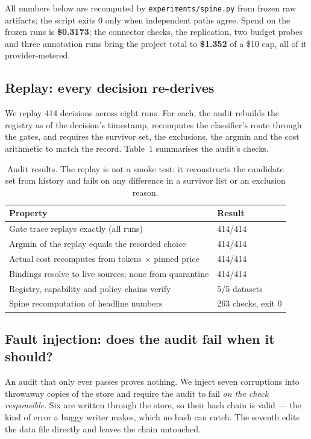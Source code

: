 \documentclass[11pt]{article}
\newcommand{\code}[1]{\texttt{#1}}
\begin{document}
All numbers below are recomputed by \code{experiments/spine.py} from frozen raw artifacts; the
script exits 0 only when independent paths agree. Spend on the frozen runs is \textbf{\$0.3173};
the connector checks, the replication, two budget probes and three annotation runs bring the project
total to \textbf{\$1.352} of a \$10 cap, all of it provider-metered.

\subsection{Replay: every decision re-derives}
\label{sec:replay}

We replay 414 decisions across eight runs. For each, the audit rebuilds the registry as of the
decision's timestamp, recomputes the classifier's route through the gates, and requires the
survivor set, the exclusions, the argmin and the cost arithmetic to match the record. Table~1
summarises the audit's checks.

\begin{table}[h]
\centering
\small
\begin{tabular}{@{}p{}p{}@{}}
\toprule
\textbf{Property} & \textbf{Result} \\
\midrule
Gate trace replays exactly (all runs) & 414/414 \\
Argmin of the replay equals the recorded choice & 414/414 \\
Actual cost recomputes from tokens $\times$ pinned price & 414/414 \\
Bindings resolve to live sources; none from quarantine & 414/414 \\
Registry, capability and policy chains verify & 5/5 datasets \\
Spine recomputation of headline numbers & 263 checks, exit 0 \\
\bottomrule
\end{tabular}
\caption{Audit results. The replay is not a smoke test: it reconstructs the candidate set from
history and fails on any difference in a survivor list or an exclusion reason.}
\end{table}

\subsection{Fault injection: does the audit fail when it should?}
\label{sec:faultinj}

An audit that only ever passes proves nothing. We inject seven corruptions into throwaway
copies of the store and require the audit to fail \emph{on the check responsible}. Six are
written through the store, so their hash chain is valid --- the kind of error a buggy writer
makes, which no hash can catch. The seventh edits the data file directly and leaves the chain
untouched.
\end{document}
